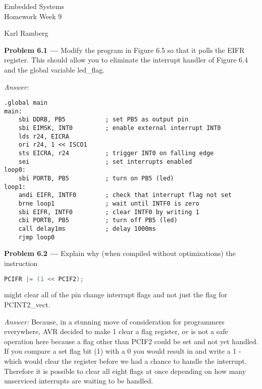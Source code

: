 \documentclass[11pt]{article}
\newcommand{\problem}[1]{\textbf{Problem #1 ---} }
\newcommand{\answer}{\textit{Answer: } }
\begin{document}
\thispagestyle{empty}

\begin{center}
{\large Embedded Systems}\\
Homework Week 9
\end{center}

\begin{flushright}
Karl Ramberg
\end{flushright}

\problem{6.1} Modify the program in Figure 6.5 so that it polls the \textsf{EIFR} register. This should allow you to eliminate the interrupt handler of Figure 6.4 and the global variable \textsf{led\_flag}.

\answer 
\begin{lstlisting}[language=AVR,columns=flexible,basicstyle=\ttfamily,commentstyle=\ttfamily]
.global main
main:
    sbi DDRB, PB5           ; set PB5 as output pin
    sbi EIMSK, INT0         ; enable external interrupt INT0
    lds r24, EICRA
    ori r24, 1 << ISCO1
    sts EICRA, r24          ; trigger INT0 on falling edge
    sei                     ; set interrupts enabled
loop0:
    sbi PORTB, PB5          ; turn on PB5 (led)
loop1:
    andi EIFR, INTF0        ; check that interrupt flag not set
    brne loop1              ; wait until INTF0 is zero
    sbi EIFR, INTF0         ; clear INTF0 by writing 1
    cbi PORTB, PB5          ; turn off PB5 (led)
    call delay1ms           ; delay 1000ms
    rjmp loop0
\end{lstlisting}

\problem{6.2} Explain why (when compiled without optimizations) the instruction
\begin{lstlisting}[language=C,columns=flexible,basicstyle=\ttfamily,showstringspaces=false,language=C,commentstyle=\ttfamily]
PCIFR |= (1 << PCIF2);
\end{lstlisting}
might clear all of the pin change interrupt flags and not just the flag for \textsf{PCINT2\_vect}.

\answer Because, in a stunning move of consideration for programmers everywhere, AVR decided to make \textsf{1} clear a flag register, $or$ is not a safe operation here because
a flag other than PCIF2 could be set and not yet handled. If you compare a set flag bit (\textsf{1}) with a \textsf{0} you would result in  and write a \textsf{1} - which would clear the register before we had a chance
to handle the interrupt. Therefore it is possible to clear all eight flags at once depending on how many unserviced interrupts are waiting to be handled.
\end{document}
